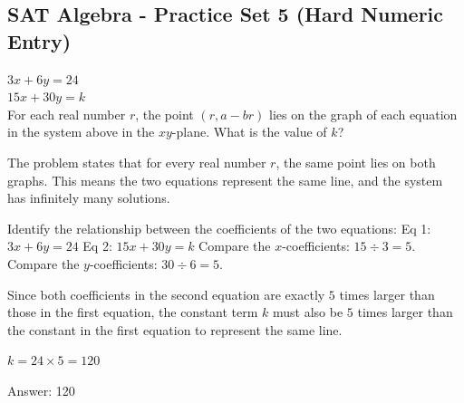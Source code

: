 \documentclass[11pt,paper=a4,answers]{exam}
\begin{document}
\begin{questions}
\pointsinrightmargin
\pointsdroppedatright
\marksnotpoints
{}
\pointformat{\boldmath\themarginpoints}
\bracketedpoints


\section*{SAT Algebra - Practice Set 5 (Hard Numeric Entry)}

\question
\begin{center}
\end{center}
$3x + 6y = 24$ \\
$15x + 30y = k$ \\
For each real number $r$, the point $(r, a - br)$ lies on the graph of each equation in the system above in the $xy$-plane. What is the value of $k$?

\begin{solution}
The problem states that for every real number $r$, the same point lies on both graphs. This means the two equations represent the same line, and the system has infinitely many solutions.
\vspace{5pt}
\begin{center}
Identify the relationship between the coefficients of the two equations:
\vspace{5pt}
Eq 1: $3x + 6y = 24$
\vspace{5pt}
Eq 2: $15x + 30y = k$
\vspace{10pt}
Compare the $x$-coefficients: $15 \div 3 = 5$.
\vspace{5pt}
Compare the $y$-coefficients: $30 \div 6 = 5$.
\end{center}
\vspace{5pt}
Since both coefficients in the second equation are exactly $5$ times larger than those in the first equation, the constant term $k$ must also be $5$ times larger than the constant in the first equation to represent the same line.
\vspace{5pt}
\begin{center}
$k = 24 \times 5 = 120$
\end{center}
\vspace{5pt}
Answer: \colorbox{yellow!100}{120}
\end{solution}


\end{questions}
\end{document}
